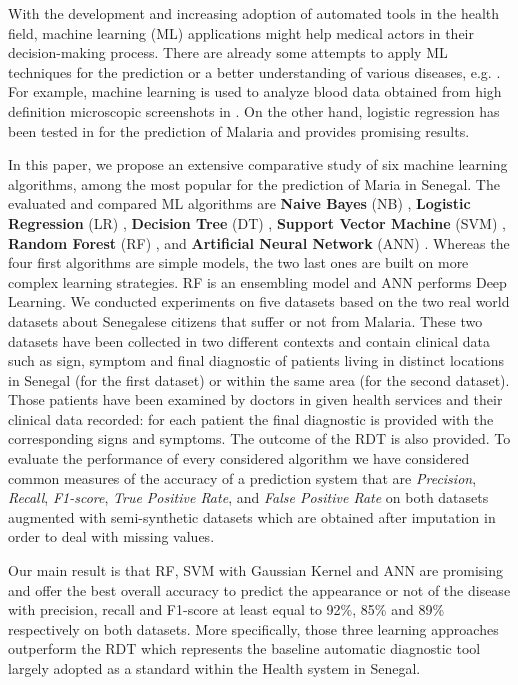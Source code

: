  With the development and increasing adoption of automated tools in the health field, machine learning  (ML) \cite{mitchell1997machine, Ug1} applications might help medical actors in their decision-making process. There are already some attempts to apply ML techniques for the prediction or a better understanding of various diseases, e.g. \cite{mbaye2019towards,gholami2017support}. For example, machine learning is used to analyze blood data obtained from high definition microscopic screenshots in \cite{gholami2017support}. On the other hand, logistic regression has been tested in \cite{mbaye2019towards} 
 for the prediction of Malaria and provides promising results.
 
 In this paper, we propose an  extensive comparative study of six machine learning algorithms, among the most popular for the prediction of Maria in Senegal. The evaluated and compared ML algorithms are \textbf{Naive Bayes} (NB) \cite{Ka17}, \textbf{Logistic Regression} (LR) \cite{Ph88},  \textbf{Decision Tree} (DT) \cite{Ro05}, \textbf{Support Vector Machine} (SVM) \cite{Ev01},
 \textbf{Random Forest} (RF) \cite{Be01},
 and \textbf{Artificial Neural Network} (ANN) \cite{Me19}. Whereas the four first algorithms are simple models, the two last ones are built on more complex learning strategies. RF is an ensembling model and ANN performs Deep Learning. We conducted experiments on five datasets based on the two real world datasets about Senegalese citizens that suffer or not from Malaria. These two datasets have been collected in two different contexts and contain clinical data such as sign, symptom and final diagnostic of patients living in distinct locations in Senegal (for the first dataset) or within the same area (for the second dataset). Those patients have been examined by doctors in given health services and their clinical data recorded: for each patient the final diagnostic is provided with the corresponding signs and symptoms. The outcome of the RDT is also provided. To evaluate the performance of every considered algorithm we have considered common measures of the accuracy of a prediction system that are \emph{Precision}, \emph{Recall}, \emph{F1-score}, \emph{True Positive Rate}, and
 \emph{False Positive Rate} on both datasets augmented with semi-synthetic datasets which are obtained after imputation in order to deal with missing values.
 
 Our main result is that RF, SVM  with Gaussian Kernel and ANN are promising and offer the best overall accuracy to predict the appearance or not of the disease with precision, recall and F1-score at least equal to 92\%, 85\% and 89\% respectively on both datasets. More specifically, those three learning approaches outperform the RDT which represents the baseline automatic diagnostic tool largely adopted as a standard within the Health system in Senegal.
 
